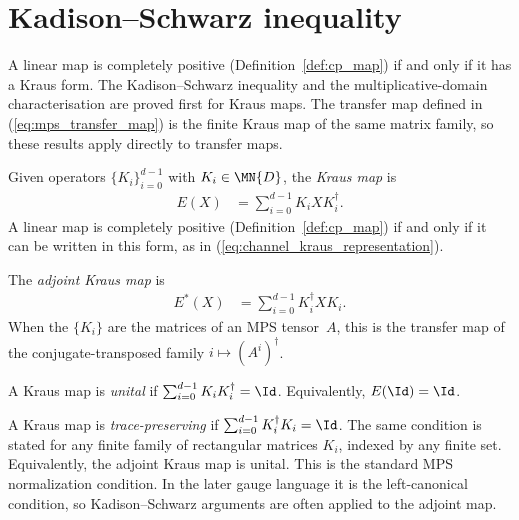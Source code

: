 \section{Kadison--Schwarz inequality}

A linear map is completely positive (Definition~\ref{def:cp_map}) if and only
if it has a Kraus form. The Kadison--Schwarz inequality and the
multiplicative-domain characterisation are proved first for Kraus maps.
The transfer map defined in (\ref{eq:mps_transfer_map}) is the finite
Kraus map of the same matrix family, so these results apply directly to transfer
maps.

\begin{definition}\label{def:kraus_map}
    \leanok
    Given operators $\{K_i\}_{i=0}^{d-1}$ with $K_i \in \MN{D}$,
    the \emph{Kraus map} is
    \begin{align}
        E(X)
        &= \sum_{i=0}^{d-1} K_i X K_i^\dagger.
        \label{eq:schwarz_kraus_map}
    \end{align}
    A linear map is completely positive
    (Definition~\ref{def:cp_map}) if and only if it can be written in this
    form, as in (\ref{eq:channel_kraus_representation}).
\end{definition}

\begin{definition}\label{def:kraus_adjoint_map}
    \leanok
    The \emph{adjoint Kraus map} is
    \begin{align}
        E^*(X)
        &= \sum_{i=0}^{d-1} K_i^\dagger X K_i.
        \label{eq:schwarz_kraus_adjoint}
    \end{align}
    When the $\{K_i\}$ are the matrices of an MPS tensor~$A$,
    this is the transfer map of the conjugate-transposed family
    $i \mapsto (A^i)^\dagger$.
\end{definition}

\begin{definition}\label{def:unital_kraus}
    \leanok
    A Kraus map is \emph{unital} if
    $\sum_{i=0}^{d-1} K_i K_i^\dagger = \Id$.
    Equivalently, $E(\Id) = \Id$.
\end{definition}

\begin{definition}\label{def:tp_kraus}
    \leanok
    A Kraus map is \emph{trace-preserving} if
    $\sum_{i=0}^{d-1} K_i^\dagger K_i = \Id$. The same condition is stated for any finite
    family of rectangular matrices $K_i$, indexed by any finite set.
    Equivalently, the adjoint Kraus map is unital.
    This is the standard MPS normalization condition.
    In the later gauge language it is the left-canonical condition,
    so Kadison--Schwarz arguments are often applied to the adjoint map.
\end{definition}

